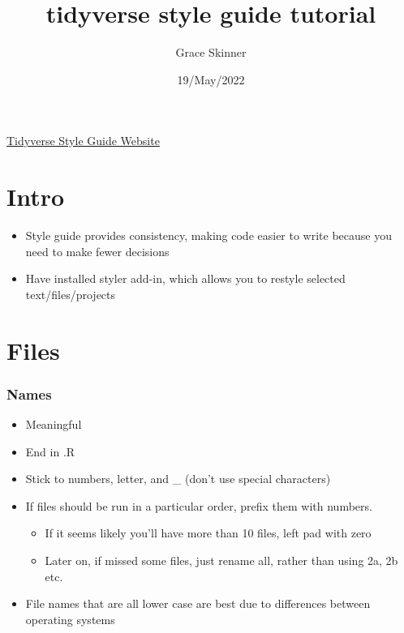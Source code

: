 \documentclass[
]{article}
\title{tidyverse style guide tutorial}
\author{Grace Skinner}
\date{19/May/2022}
\providecommand{\tightlist}{%
  \setlength{\itemsep}{0pt}\setlength{\parskip}{0pt}}
\begin{document}
\maketitle

\href{https://style.tidyverse.org/}{Tidyverse Style Guide Website}

\hypertarget{intro}{%
\section{Intro}\label{intro}}

\begin{itemize}
\tightlist
\item
  Style guide provides consistency, making code easier to write because
  you need to make fewer decisions
\item
  Have installed styler add-in, which allows you to restyle selected
  text/files/projects
\end{itemize}

\hypertarget{files}{%
\section{Files}\label{files}}

\hypertarget{names}{%
\subsubsection{Names}\label{names}}

\begin{itemize}
\tightlist
\item
  Meaningful
\item
  End in .R
\item
  Stick to numbers, letter, and \_ (don't use special characters)
\item
  If files should be run in a particular order, prefix them with
  numbers.

  \begin{itemize}
  \tightlist
  \item
    If it seems likely you'll have more than 10 files, left pad with
    zero
  \item
    Later on, if missed some files, just rename all, rather than using
    2a, 2b etc.
  \end{itemize}
\item
  File names that are all lower case are best due to differences between
  operating systems
\end{itemize}
\end{document}

